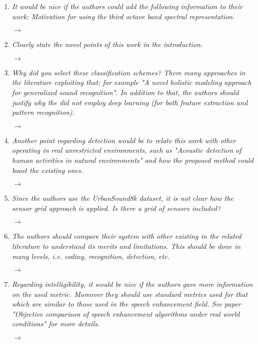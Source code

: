 \documentclass[10pt]{article}
\begin{document}
\begin{enumerate}

\item \emph{It would be nice if the authors could add the following information to their work: Motivation for using the third octave band spectral representation.}

$\rightarrow$

\item \emph{Clearly state the novel points of this work in the introduction.}

$\rightarrow$

\item \emph{Why did you select these classification schemes? There many approaches in the literature exploiting that; for example "A novel holistic modeling approach for generalized sound recognition". In addition to that, the authors should justify why the did not employ deep learning (for both feature extraction and pattern recognition).}

$\rightarrow$

\item \emph{Another point regarding detection would be to relate this work with other operating in real unrestricted environments, such as "Acoustic detection of human activities in natural environments" and how the proposed method could boost the existing ones.}

$\rightarrow$

\item \emph{Since the authors use the UrbanSound8k dataset, it is not clear how the sensor grid approach is applied. Is there a grid of sensors included?}

$\rightarrow$

\item \emph{The authors should compare their system with other existing in the related literature to understand its merits and limitations. This should be done in many levels, i.e. coding, recognition, detection, etc.}

$\rightarrow$

\item \emph{Regarding intelligibility, it would be nice if the authors gave more information on the used metric. Moreover they should use standard metrics used for that which are similar to those used in the speech enhancement field. See paper "Objective comparison of speech enhancement algorithms under real world conditions" for more details.}

$\rightarrow$

\end{enumerate}
\end{document}
